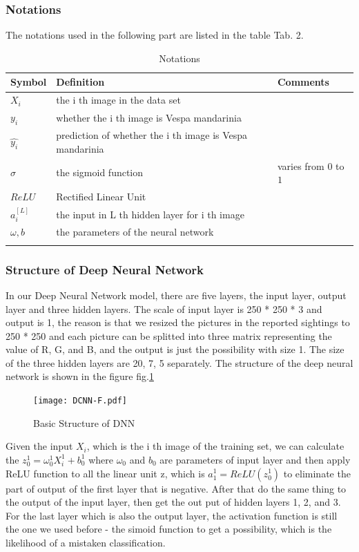 \documentclass{mcmthesis}
\begin{document}
\subsubsection{Notations}
The notations used in the following part are listed in the table Tab. 2.

\begin{table}[htbp]
\centering
\begin{tabular}{lll}
\hline 
Symbol & Definition & Comments \\
\hline
$X_i$ & the i th image in the data set & \\
$y_i$ & whether the i th image is Vespa mandarinia & \\
$ \hat{y_i}$ &  prediction of whether the i th image is Vespa mandarinia & \\
$\sigma $ & the sigmoid function & varies from 0 to $1$ \\
$ReLU$ & Rectified Linear Unit \\
$a_{i}^{[L]}$ & the input in L th hidden layer for i th image & \\

$\omega, b$ & the parameters of the neural network &  \\
\hline
\label{tab:2}
\end{tabular}
\caption{Notations}
\end{table}

\subsubsection{Structure of Deep Neural Network}

In our Deep Neural Network model, there are five layers, the input layer, output layer and three hidden layers. The scale of input layer is 250 * 250 * 3 and output is 1, the reason is that we resized the pictures in the reported sightings to 250 * 250 and each picture can be splitted into three matrix representing the value of R, G, and B, and the output is just the possibility with size 1. The size of the three hidden layers are 20, 7, 5 separately. The structure of the deep neural network is shown in the figure fig.\ref{fig:DNN}

\begin{figure}[!htbp]
	\centering
 	\texttt{[image: DCNN-F.pdf]} 
	\caption{Basic Structure of DNN}
	\label{fig:DNN}
\end{figure}

Given the input $X_i$, which is the i th image of the training set, we can calculate the $z_{0}^{1} = \omega_{0}^{1} X_{i}^{1} + b_{0}^{1}$ where $\omega_{0}$ and $b_{0}$ are parameters of input layer and then apply ReLU function to all the 
linear unit z, which is $a_{1}^{1} = ReLU(z_{0}^{1})$ to eliminate the part of output of the first layer that is negative. 
After that do the same thing to the output of the input layer, then get the out put of hidden layers 1, 2, and 3. For the last layer which is also the output layer, the activation function is still the one we used before - the simoid function to get a possibility, which is the likelihood of a mistaken classification.
\end{document}
